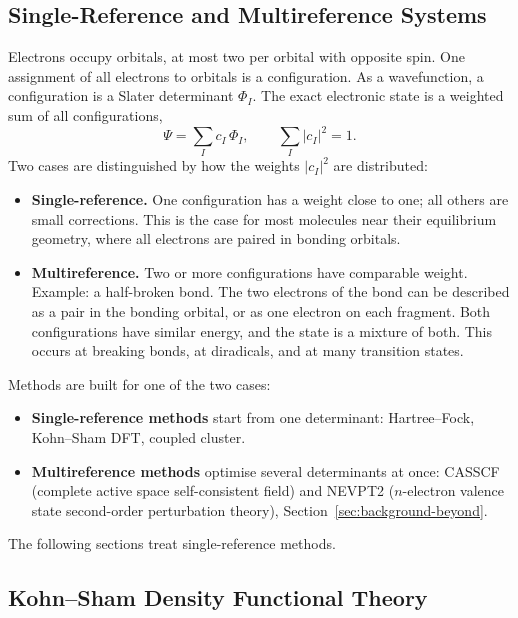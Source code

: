 \subsection{Single-Reference and Multireference Systems}
\label{sec:sr-vs-mr}

Electrons occupy orbitals, at most two per orbital with opposite spin. One
assignment of all electrons to orbitals is a configuration. As a
wavefunction, a configuration is a Slater determinant $\Phi_I$. The exact
electronic state is a weighted sum of all configurations,
%
\begin{equation}
  \Psi = \sum_I c_I \, \Phi_I , \qquad \sum_I |c_I|^2 = 1 .
  \label{eq:ci-expansion}
\end{equation}
%
Two cases are distinguished by how the weights $|c_I|^2$ are distributed:

\begin{itemize}
  \item \textbf{Single-reference.} One configuration has a weight close to
    one; all others are small corrections. This is the case for most
    molecules near their equilibrium geometry, where all electrons are paired
    in bonding orbitals.
  \item \textbf{Multireference.} Two or more configurations have comparable
    weight. Example: a half-broken bond. The two electrons of the bond can
    be described as a pair in the bonding orbital, or as one electron on
    each fragment. Both configurations have similar energy, and the state is
    a mixture of both. This occurs at breaking bonds, at diradicals, and at
    many transition states.
\end{itemize}

Methods are built for one of the two cases:

\begin{itemize}
  \item \textbf{Single-reference methods} start from one determinant:
    Hartree--Fock, Kohn--Sham DFT, coupled cluster.
  \item \textbf{Multireference methods} optimise several determinants at
    once: CASSCF (complete active space self-consistent field) and
    NEVPT2 ($n$-electron valence state second-order perturbation theory),
    Section~\ref{sec:background-beyond}.
\end{itemize}

The following sections treat single-reference methods.

\subsection{Kohn--Sham Density Functional Theory}
\label{sec:background-dft}


